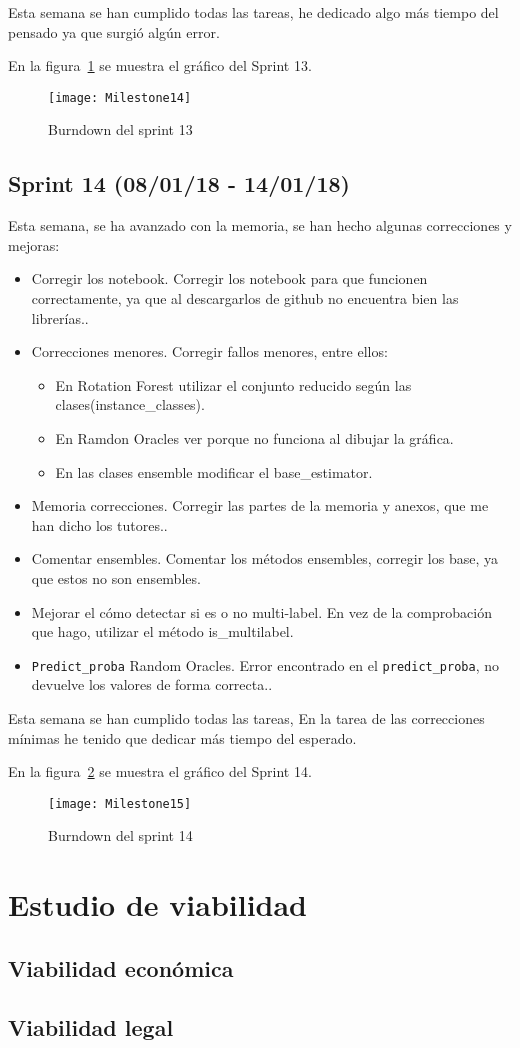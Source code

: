 Esta semana se han cumplido todas las tareas, he dedicado algo más tiempo del pensado ya que surgió algún error.

En la figura~\ref{fig:Milestone14} se muestra el gráfico del Sprint 13.

\begin{figure}
\centering
\texttt{[image: Milestone14]}
\caption{Burndown del sprint 13}
\label{fig:Milestone14}
\end{figure}

\subsection{Sprint 14 (08/01/18 - 14/01/18)}
Esta semana, se ha avanzado con la memoria, se han hecho algunas correcciones y mejoras:
\begin{itemize}
\item Corregir los notebook. Corregir los notebook para que funcionen correctamente, ya que al descargarlos de github no encuentra bien las librerías..
\item Correcciones menores. Corregir fallos menores, entre ellos:
	\begin{itemize}
		\item En Rotation Forest utilizar el conjunto reducido según las clases(instance\_classes).
		\item En Ramdon Oracles ver porque no funciona al dibujar la gráfica.
		\item En las clases ensemble modificar el base\_estimator.
	\end{itemize}
\item Memoria correcciones. Corregir las partes de la memoria y anexos, que me han dicho los tutores..
\item Comentar ensembles. Comentar los métodos ensembles, corregir los base, ya que estos no son ensembles.
\item Mejorar el cómo detectar si es o no multi-label. En vez de la comprobación que hago, utilizar el método is\_multilabel.
\item \texttt{Predict\_proba} Random Oracles. Error encontrado en el \texttt{predict\_proba}, no devuelve los valores de forma correcta..
\end{itemize}

Esta semana se han cumplido todas las tareas, En la tarea de las correcciones mínimas he tenido que dedicar más tiempo del esperado.

En la figura~\ref{fig:Milestone15} se muestra el gráfico del Sprint 14.

\begin{figure}
\centering
\texttt{[image: Milestone15]}
\caption{Burndown del sprint 14}
\label{fig:Milestone15}
\end{figure}

\section{Estudio de viabilidad}

\subsection{Viabilidad económica}

\subsection{Viabilidad legal}


